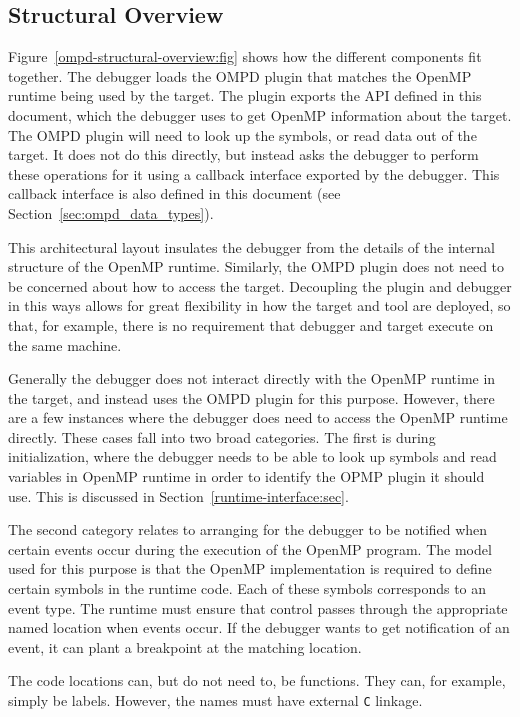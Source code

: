 \subsection{Structural Overview}
\label{structural-overview:sec}

Figure~\ref{ompd-structural-overview:fig} shows how the different components
fit together.
The debugger loads the OMPD plugin that matches the OpenMP runtime
being used by the target.
The plugin exports the API defined in this document, which the debugger
uses to get OpenMP information about the target.
The OMPD plugin will need to look up the symbols,
or read data out of the target.
It does not do this directly, but instead asks the debugger to perform
these operations for it using a callback interface exported by the debugger.
This callback interface is also defined in this document
(see Section~\ref{sec:ompd_data_types}).

This architectural layout insulates the debugger from the details
of the internal structure of the OpenMP runtime.
Similarly, the OMPD plugin does not need to be concerned about
how to access the target.
Decoupling the plugin and debugger in this ways allows for
great flexibility in how the target and tool are deployed,
so that, for example, there is no requirement that debugger
and target execute on the same machine.

Generally the debugger does not interact directly with the OpenMP
runtime in the target, and instead uses the OMPD plugin for this purpose.
However, there are a few instances where the debugger does need
to access the OpenMP runtime directly.
These cases fall into two broad categories.
The first is during initialization, where the debugger needs
to be able to look up symbols and read variables in OpenMP runtime
in order to identify the OPMP plugin it should use.
This is discussed in Section~\ref{runtime-interface:sec}.

The second category relates to arranging for the debugger to be notified
when certain events occur during the execution of the OpenMP program.
The model used for this purpose is that the OpenMP implementation
is required to define certain symbols in the runtime code.
Each of these symbols corresponds to an event type.
The runtime must ensure that control passes through the appropriate
named location when events occur.
If the debugger wants to get notification of an event, it can plant
a breakpoint at the matching location.

The code locations can, but do not need to, be functions.
They can, for example, simply be labels.
However, the names must have external \texttt{C} linkage.

